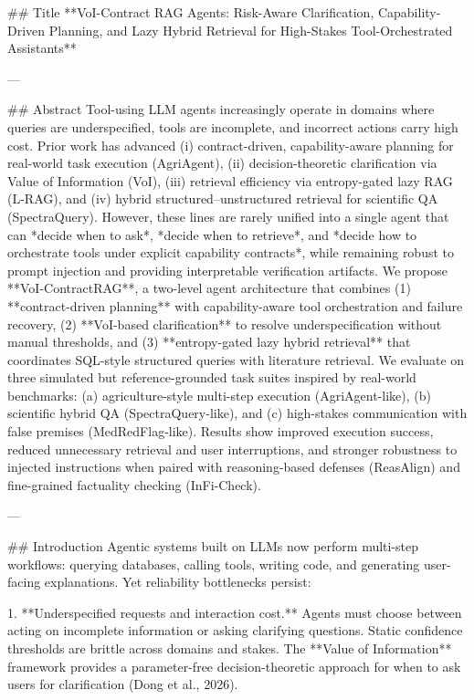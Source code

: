 ## Title
**VoI-Contract RAG Agents: Risk-Aware Clarification, Capability-Driven Planning, and Lazy Hybrid Retrieval for High-Stakes Tool-Orchestrated Assistants**

---

## Abstract
Tool-using LLM agents increasingly operate in domains where queries are underspecified, tools are incomplete, and incorrect actions carry high cost. Prior work has advanced (i) contract-driven, capability-aware planning for real-world task execution (AgriAgent), (ii) decision-theoretic clarification via Value of Information (VoI), (iii) retrieval efficiency via entropy-gated lazy RAG (L-RAG), and (iv) hybrid structured–unstructured retrieval for scientific QA (SpectraQuery). However, these lines are rarely unified into a single agent that can *decide when to ask*, *decide when to retrieve*, and *decide how to orchestrate tools under explicit capability contracts*, while remaining robust to prompt injection and providing interpretable verification artifacts.  
We propose **VoI-ContractRAG**, a two-level agent architecture that combines (1) **contract-driven planning** with capability-aware tool orchestration and failure recovery, (2) **VoI-based clarification** to resolve underspecification without manual thresholds, and (3) **entropy-gated lazy hybrid retrieval** that coordinates SQL-style structured queries with literature retrieval. We evaluate on three simulated but reference-grounded task suites inspired by real-world benchmarks: (a) agriculture-style multi-step execution (AgriAgent-like), (b) scientific hybrid QA (SpectraQuery-like), and (c) high-stakes communication with false premises (MedRedFlag-like). Results show improved execution success, reduced unnecessary retrieval and user interruptions, and stronger robustness to injected instructions when paired with reasoning-based defenses (ReasAlign) and fine-grained factuality checking (InFi-Check).  

---

## Introduction
Agentic systems built on LLMs now perform multi-step workflows: querying databases, calling tools, writing code, and generating user-facing explanations. Yet reliability bottlenecks persist:

1. **Underspecified requests and interaction cost.** Agents must choose between acting on incomplete information or asking clarifying questions. Static confidence thresholds are brittle across domains and stakes. The **Value of Information** framework provides a parameter-free decision-theoretic approach for when to ask users for clarification (Dong et al., 2026).

